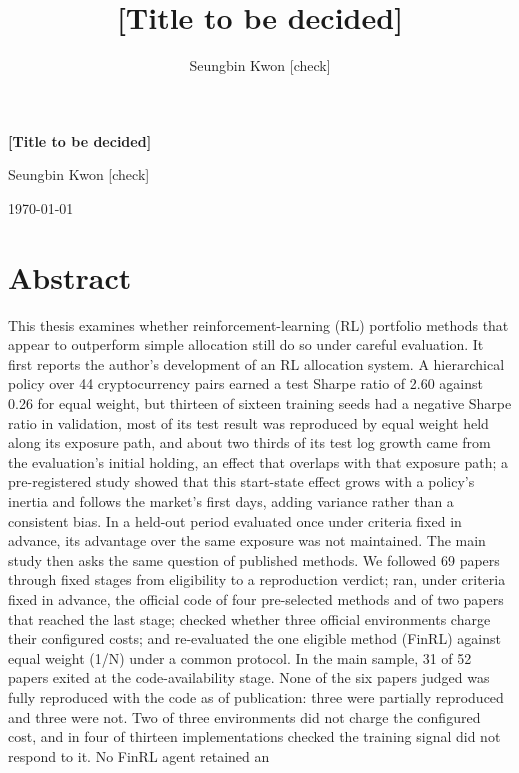 \documentclass[12pt,a4paper]{report}
\title{{[}Title to be decided{]}}
\author{Seungbin Kwon {[}check{]}}
\date{}
\begin{document}
\begin{titlepage}
\centering
\vspace*{0.25\textheight}
{\LARGE\bfseries {[}Title to be decided{]}\par}
\vspace{2cm}
{\large Seungbin Kwon {[}check{]}\par}
\vfill
{\large \today\par}
\end{titlepage}

\chapter*{Abstract}\label{abstract}

This thesis examines whether reinforcement-learning (RL) portfolio
methods that appear to outperform simple allocation still do so under
careful evaluation. It first reports the author's development of an RL
allocation system. A hierarchical policy over 44 cryptocurrency pairs
earned a test Sharpe ratio of 2.60 against 0.26 for equal weight, but
thirteen of sixteen training seeds had a negative Sharpe ratio in
validation, most of its test result was reproduced by equal weight held
along its exposure path, and about two thirds of its test log growth
came from the evaluation's initial holding, an effect that overlaps with
that exposure path; a pre-registered study showed that this start-state
effect grows with a policy's inertia and follows the market's first
days, adding variance rather than a consistent bias. In a held-out
period evaluated once under criteria fixed in advance, its advantage
over the same exposure was not maintained. The main study then asks the
same question of published methods. We followed 69 papers through fixed
stages from eligibility to a reproduction verdict; ran, under criteria
fixed in advance, the official code of four pre-selected methods and of
two papers that reached the last stage; checked whether three official
environments charge their configured costs; and re-evaluated the one
eligible method (FinRL) against equal weight (1/N) under a common
protocol. In the main sample, 31 of 52 papers exited at the
code-availability stage. None of the six papers judged was fully
reproduced with the code as of publication: three were partially
reproduced and three were not. Two of three environments did not charge
the configured cost, and in four of thirteen implementations checked the
training signal did not respond to it. No FinRL agent retained an
\end{document}
